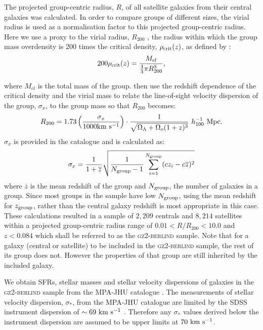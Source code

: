 \documentclass[useAMS,usenatbib]{mn2e}
\begin{document}
The projected group-centric radius, $R$, of all satellite galaxies from their central galaxies was calculated. In order to compare groups of different sizes, the virial radius is used as a normalisation factor to this projected group-centric radius. Here we use a proxy to the virial radius, $R_{200}$ \citep[see][]{navarro95}, the radius within which the group mass overdensity is 200 times the critical density, $\rho_{\rm{crit}}(z)$, as defined by \citealt{finn05}:
\begin{equation}\label{eq:overdense}
200\rho_{\rm{crit}}(z) = \frac{M_{cl}}{\frac{4}{3}\pi R_{200}^3},
\end{equation}

where $M_{cl}$ is the total mass of the group. \citeauthor{finn05} then use the redshift dependence of the critical density and the virial mass to relate the line-of-sight velocity dispersion of the group, $\sigma_x$, to the group mass so that $R_{200}$ becomes:
\begin{equation}\label{eq:r200}
R_{200} = 1.73 \left ( \frac{\sigma_x}{1000 \rm{km}~\rm{s}^{-1}} \right) \cdot \frac{1}{\sqrt{\Omega_{\Lambda} +\Omega_o(1+z)^3}} ~ h_{100}^{-1} ~\rm{Mpc}. 
\end{equation}
$\sigma_x$ is provided in the \cite{berlind06} catalogue and is calculated as:
\begin{equation}
\sigma_x = \frac{1}{1+\overline{z}} \sqrt{\frac{1}{N_{\rm{group}}-1} \sum_{i=1}^{N_{\rm{group}}}(cz_i - c\overline{z})^2}
\end{equation}
where $\overline{z}$ is the mean redshift of the group and $N_{\rm{group}}$, the number of galaxies in a group. Since most groups in the sample have low $N_{\rm{group}}$, using the mean redshift for $z_{\rm{group}}$, rather than the central galaxy redshift is most appropriate in this case. These calculations resulted in a sample of $2,209$ centrals and $8,214$ satellites within a projected group-centric radius range of $0.01 < R/R_{200} < 10.0$ and $z < 0.084$ which shall be referred to as the \textsc{gz2-berlind} sample. Note that for a galaxy (central or satellite) to be included in the \textsc{gz2-berlind} sample, the rest of its group does not. However the properties of that group are still inherited by the included galaxy. 

We obtain SFRs, stellar masses and stellar velocity dispersions of galaxies in the \textsc{gz2-berlind} sample from the MPA-JHU catalogue \citep{kauffmann03, brinchmann04}. The measurements of stellar velocity dispersion, $\sigma_*$, from the MPA-JHU catalogue are limited by the SDSS instrument dispersion of $\sim69~\rm{km}~\rm{s}^{-1}$ \citep{stoughton02}. Therefore any $\sigma_*$ values derived below the instrument dispersion are assumed to be upper limits at $70~\rm{km}~\rm{s}^{-1}$. 
\end{document}
